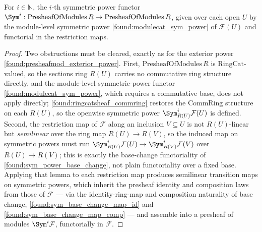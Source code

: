 \begin{lemma}\leanok
  \label{found:presheafmod_sym_power}
  For \(i\in\mathbb N\), the \(i\)-th symmetric power functor
  \(\Sym^i:\mathrm{PresheafOfModules}\,R\to\mathrm{PresheafOfModules}\,R\), given
  over each open \(U\) by the module-level symmetric power
  \cref{found:modulecat_sym_power} of \(\mathcal F(U)\) and functorial in the
  restriction maps.
\end{lemma}

\begin{proof}\leanok
  Two obstructions must be cleared, exactly as for the exterior power
  \cref{found:presheafmod_exterior_power}.  First,
  \(\mathrm{PresheafOfModules}\,R\) is \(\mathrm{RingCat}\)-valued, so the sections
  ring \(R(U)\) carries no commutative ring structure directly, and the
  module-level symmetric-power functor \cref{found:modulecat_sym_power}, which
  requires a commutative base, does not apply directly;
  \cref{found:ringcatsheaf_commring} restores the \(\mathrm{CommRing}\) structure
  on each \(R(U)\), so the openwise symmetric power \(\Sym^i_{R(U)}\mathcal F(U)\)
  is defined.  Second, the restriction map of \(\mathcal F\) along an inclusion
  \(V\subseteq U\) is not \(R(U)\)-linear but \emph{semilinear} over the ring map
  \(R(U)\to R(V)\), so the induced map on symmetric powers must run
  \(\Sym^i_{R(U)}\mathcal F(U)\to\Sym^i_{R(V)}\mathcal F(V)\) over
  \(R(U)\to R(V)\); this is exactly the base-change functoriality of
  \cref{found:sym_power_base_change}, not plain functoriality over a fixed base.
  Applying that lemma to each restriction map produces semilinear transition maps
  on symmetric powers, which inherit the presheaf identity and composition laws
  from those of \(\mathcal F\) --- via the identity-ring-map and composition
  naturality of base change, \cref{found:sym_base_change_map_id} and
  \cref{found:sym_base_change_map_comp} --- and assemble into a presheaf of modules
  \(\Sym^i\mathcal F\), functorially in \(\mathcal F\).
\end{proof}

